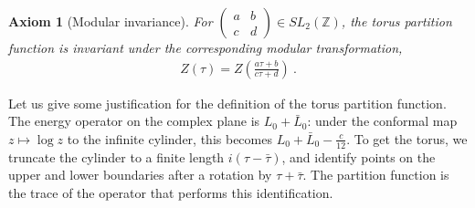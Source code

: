 \documentclass[12pt, a4paper]{article}
\theoremstyle{break}
\newtheorem{hyp}[exo]{Axiom}
\begin{document}
\begin{hyp}[Modular invariance]
For $\left(\begin{smallmatrix} a & b \\ c & d\end{smallmatrix}\right)\in SL_2(\mathbb{Z})$, the torus partition function is invariant under the corresponding modular transformation,
\begin{align}
 Z(\tau) = Z\left(\frac{a\tau+b}{c\tau +d} \right)\ .
\end{align}
\end{hyp}
Let us give some justification for the definition of the torus partition function. The energy operator on the complex plane is $L_0+\bar{L}_0$: under the conformal map $z\mapsto \log z$ to the infinite cylinder, this becomes $L_0+\bar{L}_0-\frac{c}{12}$. To get the torus, we truncate the cylinder to a finite length $i(\tau-\bar{\tau})$, and identify points on the upper and lower boundaries after a rotation by $\tau+\bar{\tau}$. The partition function is the trace of the operator that performs this identification.
\end{document}
